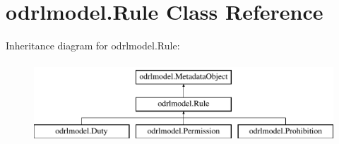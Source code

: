 \hypertarget{classodrlmodel_1_1_rule}{\section{odrlmodel.\-Rule Class Reference}
\label{classodrlmodel_1_1_rule}
}
Inheritance diagram for odrlmodel.\-Rule\-:\begin{figure}[H]
\begin{center}
\leavevmode
\includegraphics[height=3.000000cm]{classodrlmodel_1_1_rule}
\end{center}
\end{figure}
